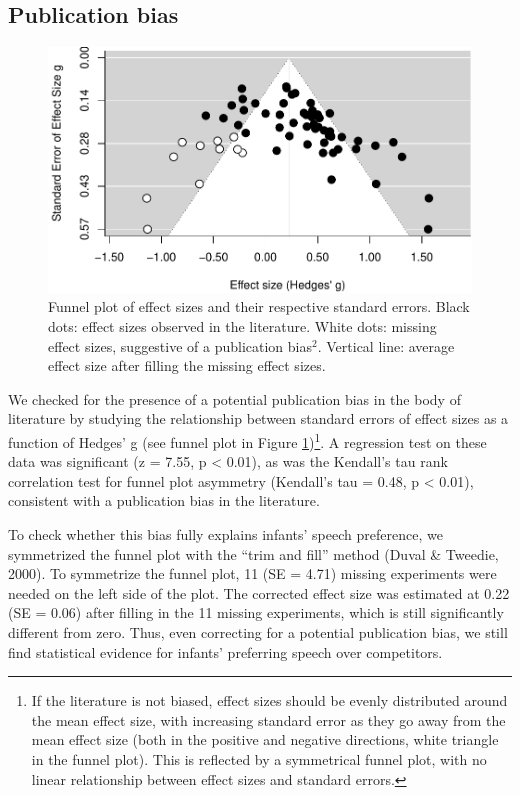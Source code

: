 \documentclass[man]{apa6}
\let\rmarkdownfootnote\footnote%
\def\footnote{\protect\rmarkdownfootnote}
\begin{document}
\hypertarget{publication-bias}{%
\subsection{Publication bias}\label{publication-bias}}

\begin{figure}
\centering
\includegraphics{MA_speech_pref_files/figure-latex/bias-1.pdf}
\caption{\label{fig:bias}Funnel plot of effect sizes and their respective standard errors. Black dots: effect sizes observed in the literature. White dots: missing effect sizes, suggestive of a publication bias\(^2\). Vertical line: average effect size after filling the missing effect sizes.}
\end{figure}

We checked for the presence of a potential publication bias in the body of literature by studying the relationship between standard errors of effect sizes as a function of Hedges' g (see funnel plot in Figure \ref{fig:bias})\footnote{If the literature is not biased, effect sizes should be evenly distributed around the mean effect size, with increasing standard error as they go away from the mean effect size (both in the positive and negative directions, white triangle in the funnel plot). This is reflected by a symmetrical funnel plot, with no linear relationship between effect sizes and standard errors.}. A regression test on these data was significant (z = 7.55, p \textless{} 0.01), as was the Kendall's tau rank correlation test for funnel plot asymmetry (Kendall's tau = 0.48, p \textless{} 0.01), consistent with a publication bias in the literature.

To check whether this bias fully explains infants' speech preference, we symmetrized the funnel plot with the \enquote{trim and fill} method (Duval \& Tweedie, 2000). To symmetrize the funnel plot, 11 (SE = 4.71) missing experiments were needed on the left side of the plot. The corrected effect size was estimated at 0.22 (SE = 0.06) after filling in the 11 missing experiments, which is still significantly different from zero. Thus, even correcting for a potential publication bias, we still find statistical evidence for infants' preferring speech over competitors.
\end{document}
